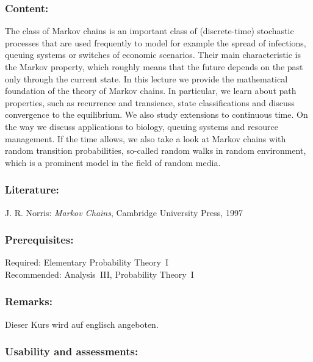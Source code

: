 \documentclass[a4paper,10pt]{article}
\begin{document}
\subsubsection*{\large
    Content:
}
The class of Markov chains is an important class of (discrete-time) stochastic processes that are used frequently to model for example the spread of infections, queuing systems or switches of economic scenarios. Their main characteristic is the Markov property, which roughly means that the future depends on the past only through the current state. In this lecture we provide the mathematical foundation of the theory of Markov chains. In particular, we learn about path properties, such as recurrence and transience, state classifications and discuss convergence to the equilibrium. We also study extensions to continuous time. On the way we discuss applications to biology, queuing systems and resource management. If the time allows, we also take a look at Markov chains with random transition probabilities, so-called random walks in random environment, which is a prominent model in the field of random media. 

\subsubsection*{\large
    Literature:
}
J. R. Norris: \emph{Markov Chains}, Cambridge University Press, 1997
\subsubsection*{\large
    Prerequisites:
}
Required: Elementary Probability Theory~I \\ Recommended: Analysis~III,  Probability Theory~I
\subsubsection*{\large
    Remarks:
}
Dieser Kurs wird auf englisch angeboten.
\subsubsection*{\large
    Usability and assessments:
}
\end{document}
